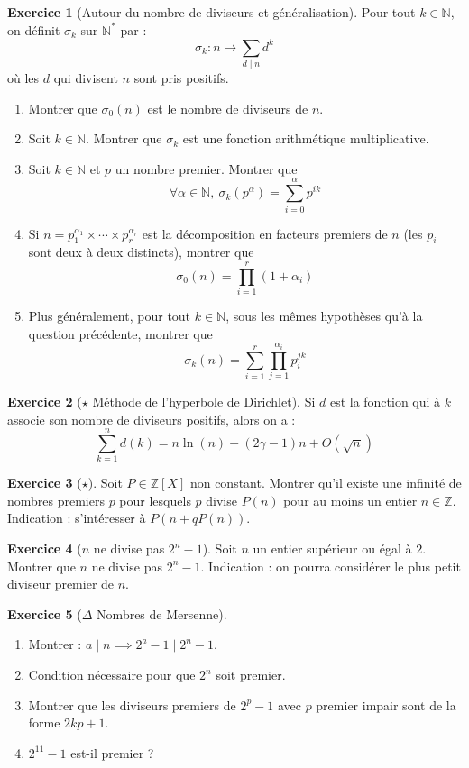 \documentclass[french]{book}
\newcommand{\N}{\mathbb{N}}
\newcommand{\Z}{\mathbb{Z}}
\newcommand{\st}{^*}
\theoremstyle{definition}
\newtheorem{ex}{Exercice}[chapter]
\theoremstyle{theorem}
\theoremstyle{remark}
\begin{document}
\begin{ex}[Autour du nombre de diviseurs et généralisation]
	Pour tout $k\in\N$, on définit $\sigma_k$ sur $\N\st$ par : $$\sigma_k:n\mapsto\sum_{d\mid n}d^k$$ où les $d$ qui divisent $n$ sont pris positifs.
	\begin{enumerate}
		\item Montrer que $\sigma_0(n)$ est le nombre de diviseurs de $n$.
		\item Soit $k\in\N$. Montrer que $\sigma_k$ est une fonction arithmétique multiplicative.
		\item Soit $k\in\N$ et $p$ un nombre premier. Montrer que $$\forall\alpha\in\N,\ \sigma_k(p^\alpha)=\sum_{i=0}^{\alpha}p^{ik}$$
		\item Si $n=p_1^{\alpha_1}\times\cdots\times p_r^{\alpha_r}$ est la décomposition en facteurs premiers de $n$ (les $p_i$ sont deux à deux distincts), montrer que $$\sigma_0(n)=\prod_{i=1}^{r}(1+\alpha_i)$$
		\item Plus généralement, pour tout $k\in\N$, sous les mêmes hypothèses qu'à la question précédente, montrer que $$\sigma_k(n)=\sum_{i=1}^{r}\prod_{j=1}^{\alpha_i}p_i^{jk}$$
	\end{enumerate}
\end{ex}

\begin{ex}[$\star$ Méthode de l'hyperbole de Dirichlet]
	Si $d$ est la fonction qui à $k$ associe son nombre de diviseurs positifs, alors on a : $$\sum_{k=1}^{n}d(k)=n\ln(n)+(2\gamma-1)n+O(\sqrt{n})$$
\end{ex}

\begin{ex}[$\star$]
	Soit $P\in\Z[X]$ non constant. Montrer qu'il existe une infinité de nombres premiers $p$ pour lesquels $p$ divise $P(n)$ pour au moins un entier $n\in\Z$. Indication : s'intéresser à $P(n+qP(n))$.
\end{ex}

\begin{ex}[$n$ ne divise pas $2^n-1$]
	Soit $n$ un entier supérieur ou égal à $2$. Montrer que $n$ ne divise pas $2^n-1$. Indication : on pourra considérer le plus petit diviseur premier de $n$.
\end{ex}

\begin{ex}[$\Delta$ Nombres de Mersenne]
	\begin{enumerate}
		\item Montrer : $a\mid n\implies 2^a-1\mid 2^n-1$.
		\item Condition nécessaire pour que $2^n$ soit premier.
		\item Montrer que les diviseurs premiers de $2^p-1$ avec $p$ premier impair sont de la forme $2kp+1$.
		\item $2^{11}-1$ est-il premier ?
	\end{enumerate}
\end{ex}
\end{document}

